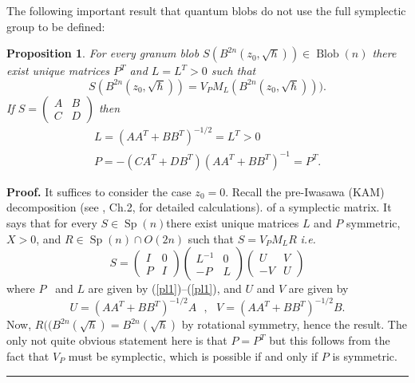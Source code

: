 \documentclass[11pt]{article}%
\newtheorem{proposition}[theorem]{Proposition}
\newenvironment{proof}[1][Proof]{\noindent\textbf{#1.} }{\ \rule{0.5em}{0.5em}}
\begin{document}
The following important result that quantum blobs do not use the full
symplectic group to be defined:

\begin{proposition}
For every granum blob $S(B^{2n}(z_{0},\sqrt{\hbar}))\in\operatorname*{Blob}%
(n)$ there exist unique matrices $P^{T}$ and $L=L^{T}>0$ such that
\begin{equation}
S(B^{2n}(z_{0},\sqrt{\hbar}))=V_{P}M_{L}(B^{2n}(z_{0},\sqrt{\hbar}))).
\label{SB}%
\end{equation}
If $S=%
\begin{pmatrix}
A & B\\
C & D
\end{pmatrix}
$ then
\begin{gather}
L=(AA^{T}+BB^{T})^{-1/2}=L^{T}>0\label{pl1}\\
P=-(CA^{T}+DB^{T})(AA^{T}+BB^{T})^{-1}=P^{T}. \label{pl2}%
\end{gather}

\end{proposition}

\begin{proof}
It suffices to consider the case $z_{0}=0$. Recall the pre-Iwasawa (KAM)
decomposition \cite{Dutta,iwa} (see \cite{Birk}, Ch.2, for detailed
calculations). of a symplectic matrix. It says that for every $S\in
\operatorname*{Sp}(n)$there exist unique matrices $L$ and $P$ symmetric,
$X>0$, and $R\in\operatorname*{Sp}(n)\cap O(2n)$ such that $S=V_{P}M_{L}R$
\textit{i.e.}
\begin{equation}
S=%
\begin{pmatrix}
I & 0\\
P & I
\end{pmatrix}%
\begin{pmatrix}
L^{-1} & 0\\
-P & L
\end{pmatrix}%
\begin{pmatrix}
U & V\\
-V & U
\end{pmatrix}
\label{iwa1}%
\end{equation}
where $P$ \ and $L$ are given by (\ref{pl1})--(\ref{pl1}), and $U$ and $V$ are
given by%
\begin{equation}
U=(AA^{T}+BB^{T})^{-1/2}A\text{ \ },\text{ \ }V=(AA^{T}+BB^{T})^{-1/2}B.
\label{unixy}%
\end{equation}
Now, $R((B^{2n}(\sqrt{\hbar})=B^{2n}(\sqrt{\hbar})$ by rotational symmetry,
hence the result. The only not quite obvious statement here is that $P=P^{T}$
but this follows from the fact that $V_{P}$ must be symplectic, which is
possible if and only if $P$ is symmetric.
\end{proof}
\end{document}
